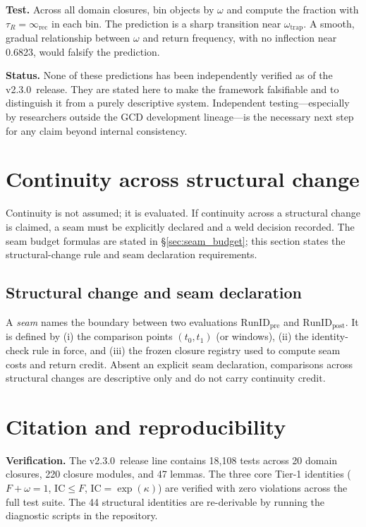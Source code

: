 \documentclass[
  aps,
  prd,
  preprint,
  superscriptaddress,
  nofootinbib,
  floatfix
]{revtex4-2}
\newcommand{\Rinf}{\infty_{\mathrm{rec}}}
\newcommand{\IC}{\mathrm{IC}}
\newcommand{\ValidatorLine}{v2.3.0}
\begin{document}
\textbf{Test.} Across all domain closures, bin objects by $\omega$ and compute the fraction with $\tau_R = \Rinf$
in each bin. The prediction is a sharp transition near $\omega_{\mathrm{trap}}$.
A smooth, gradual relationship between $\omega$ and return frequency, with no inflection near 0.6823,
would falsify the prediction.

\medskip
\noindent\textbf{Status.}
None of these predictions has been independently verified as of the \ValidatorLine\ release.
They are stated here to make the framework falsifiable and to distinguish it from a purely descriptive system.
Independent testing---especially by researchers outside the GCD development lineage---is the necessary
next step for any claim beyond internal consistency.

\section{Continuity across structural change}
\label{sec:continuity}

Continuity is not assumed; it is evaluated. If continuity across a structural change is claimed, a seam must be
explicitly declared and a weld decision recorded. The seam budget formulas are stated in \S\ref{sec:seam_budget};
this section states the structural-change rule and seam declaration requirements.

\subsection{Structural change and seam declaration}
A \emph{seam} names the boundary between two evaluations $\mathrm{RunID}_{\mathrm{pre}}$ and $\mathrm{RunID}_{\mathrm{post}}$.
It is defined by (i) the comparison points $(t_0,t_1)$ (or windows), (ii) the identity-check rule in force,
and (iii) the frozen closure registry used to compute seam costs and return credit.
Absent an explicit seam declaration, comparisons across structural changes are descriptive only and do not carry continuity credit.
\section{Citation and reproducibility}
\label{sec:citation_repro}

\noindent\textbf{Verification.}
The \ValidatorLine\ release line contains 18{,}108 tests across 20 domain closures, 220 closure modules,
and 47 lemmas. The three core Tier-1 identities ($F+\omega=1$, $\IC\le F$, $\IC=\exp(\kappa)$) are verified with
zero violations across the full test suite. The 44 structural identities are re-derivable by running the diagnostic
scripts in the repository.
\end{document}

